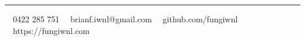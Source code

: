 \documentclass[11pt,letterpaper]{article}
\begin{document}
\hrule
\vspace{-1em}
\begin{center}
	\vspace{0.8cm}
	\raisebox{-0.2\height} {\Large \faPhoneSquare} \ \  0422 285 751 \hfill\raisebox{-0.2\height}{\Large \faEnvelopeSquare} \ \ brianf.iwnl@gmail.com \hfill \raisebox{-0.2\height}{\Large \faGithubSquare} \ \ github.com/fungiwnl \hfill \raisebox{-0.2\height}{\Large \faGlobe} \ \ https://fungiwnl.com
\end{center}
\end{document}
